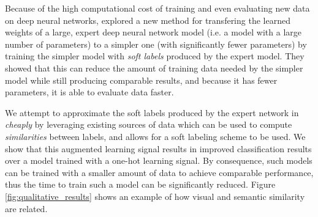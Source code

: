 Because of the high computational cost of training and even evaluating new data
on deep neural networks, \cite{hinton2015distilling} explored a new method
for transfering the learned weights of a large, expert deep neural network model
(i.e. a model with a large number of parameters) to a simpler one (with
significantly fewer parameters) by training the simpler model with \emph{soft
labels} produced by the expert model. They showed that this can reduce the
amount of training data needed by the simpler model while still producing
comparable results, and because it has fewer parameters, it is able to evaluate
data faster.

We attempt to approximate the soft labels produced by the expert network in
\cite{hinton2015distilling} \emph{cheaply} by leveraging existing sources of
data which can be used to compute \emph{similarities} between labels, and allows
for a soft labeling scheme to be used.  We show that this augmented learning
signal results in improved classification results over a model trained with a
one-hot learning signal. By consequence, such models can be trained with a
smaller amount of data to achieve comparable performance, thus the time to train
such a model can be significantly reduced.
Figure \ref{fig:qualitative_results} shows an example of how visual and semantic
similarity are related.


